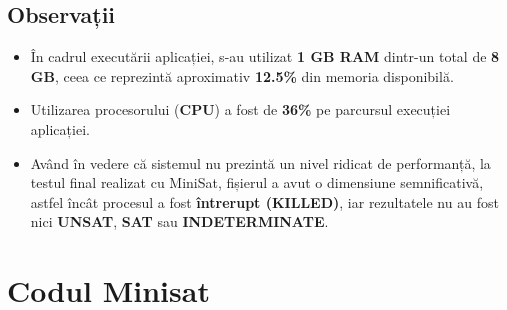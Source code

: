 \documentclass{llncs}
\begin{document}
\subsection{Observații}
\begin{itemize}
    \item În cadrul executării aplicației, s-au utilizat \textbf{1 GB RAM} dintr-un total de \textbf{8 GB}, ceea ce reprezintă aproximativ \textbf{12.5\%} din memoria disponibilă.
    \item Utilizarea procesorului (\textbf{CPU}) a fost de \textbf{36\%} pe parcursul execuției aplicației.
        \item Având în vedere că sistemul nu prezintă un nivel ridicat de performanță, la testul final realizat cu MiniSat, fișierul a avut o dimensiune semnificativă, astfel încât procesul a fost \textbf{întrerupt (KILLED)}, iar rezultatele nu au fost nici \textbf{UNSAT}, \textbf{SAT} sau \textbf{INDETERMINATE}.

\end{itemize}




\section{Codul Minisat}
\end{document}
